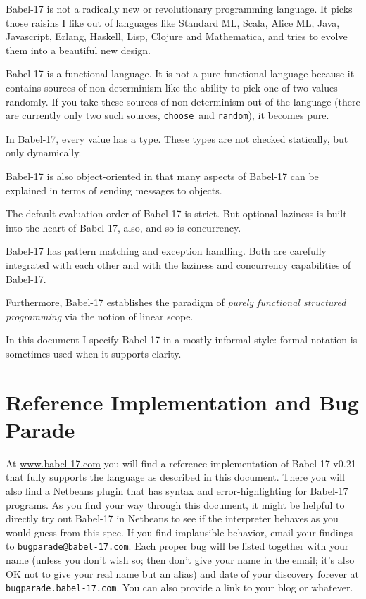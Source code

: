 \documentclass[11pt]{amsart}
\newcommand{\babelsrc}[1] {\lstinline!#1!}
\begin{document}
Babel-17 is not a radically new or revolutionary programming language. It picks those raisins I like out of languages like Standard ML, Scala, Alice ML, Java, Javascript, Erlang, Haskell, Lisp, Clojure and Mathematica, and tries to evolve them into a beautiful new design. 

Babel-17 is a functional language. It is not a pure functional language because it contains sources of non-determinism like the ability to pick one of two values randomly. If you take these sources of non-determinism out of the language (there are currently only two such sources, \babelsrc{choose}\ and \babelsrc{random}), it becomes pure. 

In Babel-17, every value has a type. These types are not checked statically, but only dynamically. 

Babel-17 is also object-oriented in that many aspects of Babel-17 can be explained in terms of sending messages to objects. 

The default evaluation order of Babel-17 is strict. But optional laziness is built into the heart of Babel-17, also, and so is concurrency. 

Babel-17 has pattern matching and exception handling. Both are carefully integrated with each other and with the laziness and concurrency capabilities of Babel-17.

Furthermore, Babel-17 establishes the paradigm of \emph{purely functional structured programming}  via the notion of linear scope.

In this document  I specify Babel-17 in a mostly informal style: formal notation is sometimes used when it supports clarity.

\section{Reference Implementation and Bug Parade}

At \url{www.babel-17.com} you will find a reference implementation of Babel-17 v0.21 that fully supports the language as described in this document. There you will also find a Netbeans plugin that has syntax and error-highlighting for Babel-17 programs. As you find your way through this document, it might be helpful to directly try out Babel-17 in Netbeans to see if the interpreter behaves as you would guess from this spec. If you find implausible behavior, email your findings to \texttt{bugparade@babel-17.com}. Each proper bug will be listed together with your name (unless you don't wish so; then don't give your name in the email; it's also OK not to give your real name but an alias) and date of your discovery forever at \texttt{bugparade.babel-17.com}. You can also provide a link to your blog or whatever. 
\end{document}
